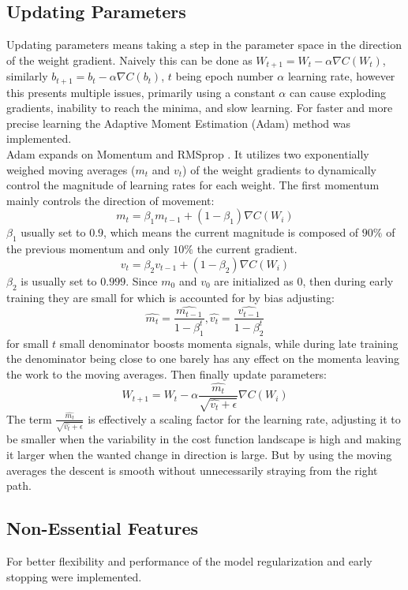 \subsection{Updating Parameters}
Updating parameters means taking a step in the parameter space in the direction of the weight gradient. Naively this can be done as $W_{t+1} = W_{t} - \alpha \nabla C(W_{t})$, similarly $b_{t+1} = b_{t} - \alpha \nabla C(b_{t})$, $t$ being epoch number $\alpha$ learning rate, however this presents multiple issues, primarily using a constant $\alpha$ can cause exploding gradients, inability to reach the minima, and slow learning. For faster and more precise learning the Adaptive Moment Estimation (Adam) \cite{kingma2017adammethodstochasticoptimization} method was implemented.\\
Adam expands on Momentum \cite{polyak1964some,rumelhart1986learning} and RMSprop \cite{tieleman2012rmsprop}. It utilizes two exponentially weighed moving averages ($m_t$ and $v_t$) of the weight gradients to dynamically control the magnitude of learning rates for each weight. The first momentum mainly controls the direction of movement:
$$
m_{t} = \beta_1 m_{t-1} + (1-\beta_1) \nabla C(W_i)
$$
$\beta_1$ usually set to $0.9$, which means the current magnitude is composed of $90\%$ of the previous momentum and only $10\%$ the current gradient. 
$$
v_{t} = \beta_2 v_{t-1} + (1-\beta_2) \nabla C(W_i)
$$
$\beta_2$ is usually set to $0.999$. Since $m_0$ and $v_0$ are initialized as $0$, then during early training they are small for which is accounted for by bias adjusting:
$$
\hat{m_t} = \frac{\hat{m_{t-1}}}{1-\beta_1^t}, \hat{v_t} = \frac{\hat{v_{t-1}}}{1-\beta_2^t}
$$
for small $t$ small denominator boosts momenta signals, while during late training the denominator being close to one barely has any effect on the momenta leaving the work to the moving averages. Then finally update parameters:
$$
W_{t+1} = W_t - \alpha \frac{\hat{m_t}}{\sqrt{\hat{v_t}+\epsilon}}\nabla C(W_i)
$$
The term $\frac{\hat{m_t}}{\sqrt{\hat{v_t}+\epsilon}}$ is effectively a scaling factor for the learning rate, adjusting it to be smaller when the variability in the cost function landscape is high and making it larger when the wanted change in direction is large. But by using the moving averages the descent is smooth without unnecessarily straying from the right path.

\subsection{Non-Essential Features}
For better flexibility and performance of the model regularization and early stopping were implemented.

